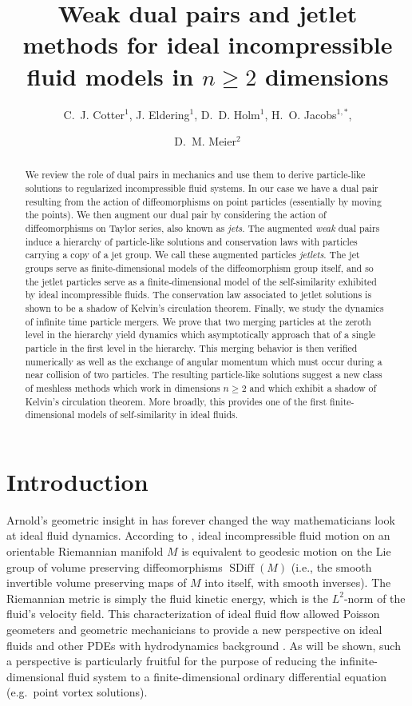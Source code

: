 \documentclass[12pt]{amsart}
\title[Weak dual pairs and jetlet methods for ideal fluids]%
{Weak dual pairs and jetlet methods for ideal incompressible fluid models in $n \geq 2$ dimensions}
\author{C.~J. Cotter$^1$, J. Eldering$^1$, D.~D. Holm$^1$, H.~O. Jacobs$^{1,*}$,}
\author{D.~M. Meier$^2$}
\DeclareMathOperator{\SDiff}{SDiff}
\begin{document}
\begin{abstract}
  We review the role of dual pairs in mechanics and use them
  to derive particle-like solutions to regularized incompressible
  fluid systems.
  In our case we have a dual pair resulting from the action of
  diffeomorphisms on point particles (essentially by moving the points).
  We then augment our dual pair by considering the action of diffeomorphisms
  on Taylor series, also known as \emph{jets}.
  The augmented \emph{weak} dual pairs induce a hierarchy of particle-like solutions
  and conservation laws
  with particles carrying a copy of a jet group.
  We call these augmented particles \emph{jetlets}.
  The jet groups serve as finite-dimensional models of the diffeomorphism
  group itself, and so the jetlet particles serve as a finite-dimensional
  model of the self-similarity exhibited by ideal
  incompressible fluids.
  The conservation law associated to jetlet solutions is 
  shown to be a shadow of Kelvin's circulation theorem.
  Finally, we study the dynamics of infinite time particle mergers.
  We prove that two merging particles at the zeroth level in the hierarchy
  yield dynamics which asymptotically approach that of a single particle in the first level in the hierarchy.
  This merging behavior is then verified numerically
  as well as the exchange of angular momentum which must
  occur during a near collision of two particles.
  The resulting particle-like solutions suggest a new class
  of meshless methods which work in dimensions $n \geq 2$
  and which exhibit a shadow of Kelvin's circulation theorem.
  More broadly, this provides one of the first finite-dimensional models of
  self-similarity in ideal fluids.
\end{abstract}

\maketitle

\section{Introduction}
Arnold's geometric insight in \cite{Arnold1966}  has forever changed the way mathematicians look at ideal fluid dynamics.  According to \cite{Arnold1966}, ideal incompressible fluid motion on an
orientable Riemannian manifold $M$ is equivalent to geodesic motion on the Lie group of volume preserving diffeomorphisms $\SDiff(M)$ (i.e., the smooth invertible volume preserving maps of $M$ into itself, with smooth inverses).
The Riemannian metric is simply the fluid kinetic energy, which is the $L^2$-norm of the fluid's velocity field.
This characterization of ideal fluid flow allowed Poisson geometers and geometric mechanicians to provide a new perspective on ideal fluids and other PDEs with hydrodynamics background \cite{EbinMarsden1970,MarsdenWeinstein1983,Zeitlin1991,ArnoldKhesin1998,HolmMarsdenRatiu1998,FoiasHolmTiti2001}.
As will be shown, such a perspective is particularly fruitful for the purpose of reducing the infinite-dimensional fluid system
to a finite-dimensional ordinary differential equation (e.g.\ point vortex solutions).
\end{document}
